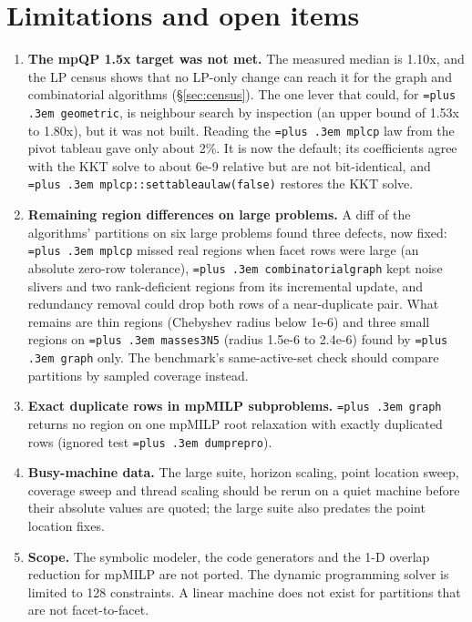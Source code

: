 \documentclass[10pt,a4paper]{article}
\newcommand{\code}[1]{{\let\_\bu\texttt{\spaceskip=\fontdimen2\font plus .3em #1}}}
\newcommand{\bu}{\textunderscore\hspace{0pt}}
\begin{document}
\section{Limitations and open items}
\label{sec:limits}

\begin{enumerate}
  \item \textbf{The mpQP 1.5x target was not met.} The measured median is 1.10x, and the LP census shows that no LP-only change can reach it for the graph and combinatorial algorithms (\S\ref{sec:census}).
    The one lever that could, for \code{geometric}, is neighbour search by inspection (an upper bound of 1.53x to 1.80x), but it was not built. Reading the \code{mplcp} law from the pivot tableau gave only about 2\%. It is now the default; its coefficients agree with
    the KKT solve to about 6e-9 relative but are not bit-identical, and \code{mplcp::set\_tableau\_law(false)} restores the KKT solve.
  \item \textbf{Remaining region differences on large problems.} A diff of the algorithms' partitions on six large problems found three defects, now fixed: \code{mplcp} missed real regions when facet rows were large (an absolute zero-row tolerance), \code{combinatorial\_graph} kept noise slivers and two rank-deficient regions from its incremental update, and redundancy removal could drop both rows of a near-duplicate pair. What remains are thin regions (Chebyshev radius below 1e-6) and three small regions on \code{masses3\_N5} (radius 1.5e-6 to 2.4e-6) found by \code{graph} only. The benchmark's same-active-set check should compare partitions by sampled coverage instead.
  \item \textbf{Exact duplicate rows in mpMILP subproblems.} \code{graph} returns no region on one mpMILP root relaxation with exactly duplicated rows (ignored test \code{dump\_repro}).
  \item \textbf{Busy-machine data.} The large suite, horizon scaling, point location sweep, coverage sweep and thread scaling should be rerun on a quiet machine before their absolute values are quoted; the large suite also predates the point location fixes.
  \item \textbf{Scope.} The symbolic modeler, the code generators and the 1-D overlap reduction for mpMILP are not ported. The dynamic programming solver is limited to 128 constraints. A linear machine does not exist for partitions that are not facet-to-facet.
\end{enumerate}
\end{document}
